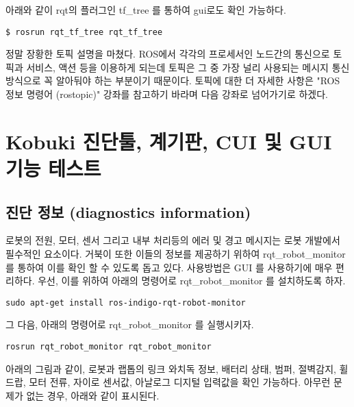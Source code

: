 아래와 같이 rqt의 플러그인 tf\_tree 를 통하여 gui로도 확인 가능하다.

\vspace{\baselineskip}
\begin{lstlisting}[language=ROS]
$ rosrun rqt_tf_tree rqt_tf_tree 
\end{lstlisting}

정말 장황한 토픽 설명을 마쳤다. ROS에서 각각의 프로세서인 노드간의 통신으로 토픽과 서비스, 액션 등을 이용하게 되는데 토픽은 그 중 가장 널리 사용되는 메시지 통신 방식으로 꼭 알아둬야 하는 부분이기 때문이다. 토픽에 대한 더 자세한 사항은 "ROS 정보 명령어 (rostopic)" 강좌를 참고하기 바라며 다음 강좌로 넘어가기로 하겠다.

\section{Kobuki 진단툴, 계기판, CUI 및 GUI 기능 테스트}

\subsection{진단 정보 (diagnostics information)}

로봇의 전원, 모터, 센서 그리고 내부 처리등의 에러 및 경고 메시지는 로봇 개발에서 필수적인 요소이다. 거북이 또한 이들의 정보를 제공하기 위하여  rqt\_robot\_monitor 를 통하여 이를 확인 할 수 있도록 돕고 있다. 사용방법은 GUI 를 사용하기에 매우 편리하다. 우선, 이를 위하여 아래의 명령어로 rqt\_robot\_monitor 를 설치하도록 하자.

\vspace{\baselineskip}
\begin{lstlisting}[language=ROS]
sudo apt-get install ros-indigo-rqt-robot-monitor
\end{lstlisting}


그 다음, 아래의 명령어로 rqt\_robot\_monitor 를 실행시키자.

\vspace{\baselineskip}
\begin{lstlisting}[language=ROS]
rosrun rqt_robot_monitor rqt_robot_monitor
\end{lstlisting}


아래의 그림과 같이, 로봇과 랩톱의 링크 와치독 정보, 배터리 상태, 범퍼, 절벽감지, 휠 드랍, 모터 전류, 자이로 센서값, 아날로그 디지털 입력값을 확인 가능하다. 아무런 문제가 없는 경우, 아래와 같이 표시된다.


